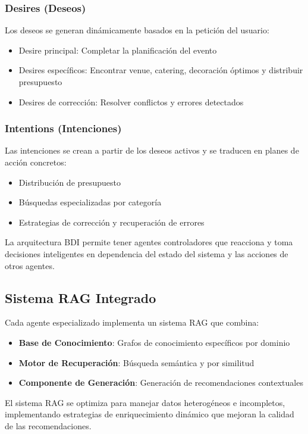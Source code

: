 \documentclass[runningheads,a4paper]{llncs}
\begin{document}
\subsubsection{Desires (Deseos)}
Los deseos se generan dinámicamente basados en la petición del usuario:
\begin{itemize}
    \item Desire principal: Completar la planificación del evento
    \item Desires específicos: Encontrar venue, catering, decoración óptimos y distribuir presupuesto
    \item Desires de corrección: Resolver conflictos y errores detectados
\end{itemize}

\subsubsection{Intentions (Intenciones)}
Las intenciones se crean a partir de los deseos activos y se traducen en planes de acción concretos:
\begin{itemize}
    \item Distribución de presupuesto
    \item Búsquedas especializadas por categoría
    \item Estrategias de corrección y recuperación de errores
\end{itemize}

La arquitectura BDI permite tener agentes controladores que reacciona y toma decisiones inteligentes en dependencia del estado del sistema y las acciones de otros agentes.

\subsection{Sistema RAG Integrado}

Cada agente especializado implementa un sistema RAG que combina:

\begin{itemize}
    \item \textbf{Base de Conocimiento}: Grafos de conocimiento específicos por dominio
    \item \textbf{Motor de Recuperación}: Búsqueda semántica y por similitud
    \item \textbf{Componente de Generación}: Generación de recomendaciones contextuales
\end{itemize}

El sistema RAG se optimiza para manejar datos heterogéneos e incompletos, implementando estrategias de enriquecimiento dinámico que mejoran la calidad de las recomendaciones.
\end{document}
